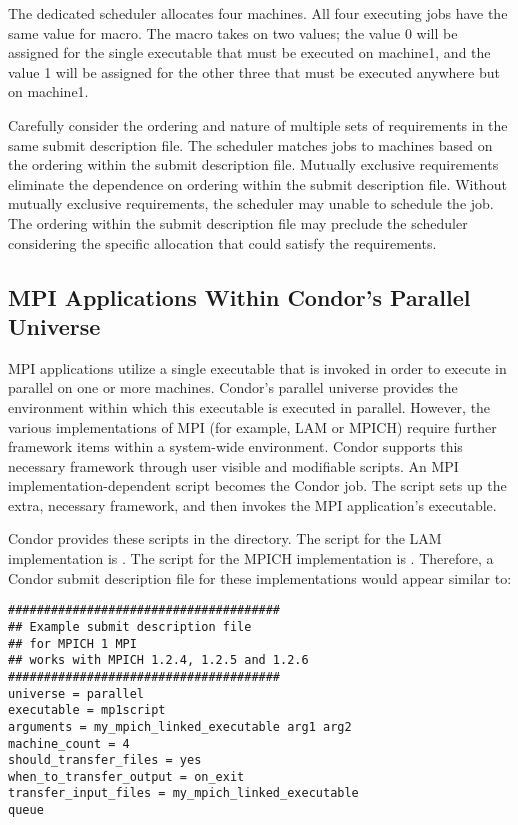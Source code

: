 The dedicated scheduler allocates four machines.
All four executing jobs have the same value for 
macro.
The  macro takes on two values;
the value 0 will be assigned for the single executable
that must be executed on machine1, and
the value 1 will be assigned for the other three 
that must be executed anywhere but on machine1.

Carefully consider the ordering and nature of multiple
sets of requirements in the same submit description file.
The scheduler matches jobs to machines based on the ordering
within the submit description file.
Mutually exclusive requirements eliminate the dependence on
ordering within the submit description file.
Without mutually exclusive requirements,
the scheduler may unable to schedule the job.
The ordering within the submit description file may preclude
the scheduler considering the specific allocation that
could satisfy the requirements.

\subsection{\label{sec:parallel-mpi-submit}MPI Applications Within Condor's Parallel Universe}

MPI applications utilize a single executable that is invoked in order to
execute in parallel on one or more machines. 
Condor's parallel universe provides the environment within
which this executable is executed in parallel.
However, the various implementations of MPI
(for example, LAM or MPICH) require further framework items within
a system-wide environment.
Condor supports this necessary framework through 
user visible and modifiable scripts.
An MPI implementation-dependent script becomes the Condor job.
The script sets up the extra, necessary framework,
and then invokes the MPI application's executable.

Condor provides these scripts in the
directory.
The script for the LAM implementation is .
The script for the MPICH implementation is .
Therefore, a Condor submit description file for these
implementations would appear similar to:

\begin{verbatim}
######################################
## Example submit description file
## for MPICH 1 MPI
## works with MPICH 1.2.4, 1.2.5 and 1.2.6
######################################
universe = parallel
executable = mp1script
arguments = my_mpich_linked_executable arg1 arg2
machine_count = 4
should_transfer_files = yes
when_to_transfer_output = on_exit
transfer_input_files = my_mpich_linked_executable
queue
\end{verbatim}

